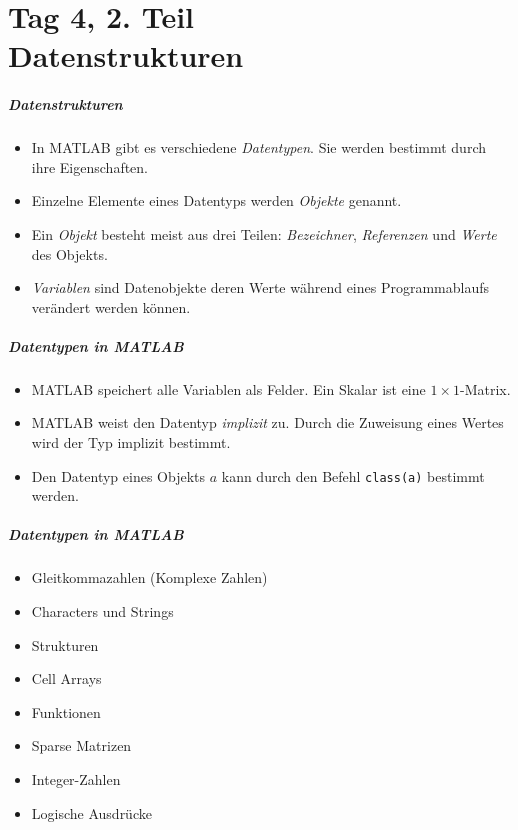 \part{Tag 4, 2. Teil  \\ Datenstrukturen}
%
%
%
\begin{frame}[fragile]\frametitle{Datenstrukturen}
\begin{itemize}
\item In MATLAB gibt es verschiedene {\it Datentypen}. 
Sie werden bestimmt durch ihre Eigenschaften.
\item Einzelne Elemente eines Datentyps werden {\it Objekte} genannt. 
\item Ein {\it Objekt} besteht meist aus drei Teilen: {\it Bezeichner}, {\it
Referenzen} und {\it Werte} des Objekts.  
\item {\it Variablen} sind Datenobjekte deren Werte w\"ahrend eines
Programmablaufs ver\"andert werden k\"onnen. 
\end{itemize}
\end{frame}
%
%
%
\begin{frame}[fragile]\frametitle{Datentypen in MATLAB}
\begin{itemize}
\item MATLAB speichert alle Variablen als Felder. Ein Skalar ist eine $1 \times
1$-Matrix. 
\item MATLAB weist den Datentyp {\it implizit} zu. Durch die Zuweisung eines
Wertes wird der Typ implizit bestimmt. 
\item Den Datentyp eines Objekts $a$ kann durch den Befehl \alert{
\lstinline!class(a)!} bestimmt werden.
\end{itemize}
\end{frame}
%
%
%
\begin{frame}[fragile]\frametitle{Datentypen in MATLAB}
\begin{itemize}
\item Gleitkommazahlen (Komplexe Zahlen)
\item Characters und Strings
\item Strukturen
\item Cell Arrays
\item Funktionen
\item Sparse Matrizen
\item Integer-Zahlen
\item Logische Ausdr\"ucke
\end{itemize}
\end{frame}
%
%
